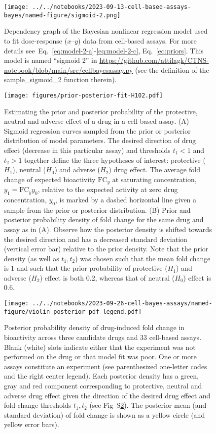 \documentclass[letterpaper]{article}
\begin{document}
\begin{figure}[p]
\texttt{[image: ../../notebooks/2023-09-13-cell-based-assays-bayes/named-figure/sigmoid-2.png]}
\caption{Dependency graph of the Bayesian nonlinear regression model used to
  fit dose-response ($x$--$y$) data from cell-based assays.
  For more details see~Eq.~\ref{eq:model-2-a}-\ref{eq:model-2-c},
  Eq.~\ref{eq:priors}.  This model is named ``sigmoid 2'' in
  \url{https://github.com/attilagk/CTNS-notebook/blob/main/src/cellbayesassay.py}
  (see the definition of the sample\_sigmoid\_2 function therein).
}
\label{fig:model-2-plate}
\end{figure}


\begin{figure}[p]
\texttt{[image: figures/prior-posterior-fit-H102.pdf]}
\caption{Estimating the prior and posterior probability of the protective, neutral
  and adverse effect of a drug in a cell-based assay.  (A) Sigmoid regression
  curves sampled from the prior or posterior distribution of model parameters.
  The desired direction of drug effect (decrease in this particular assay) and
  thresholds $t_1<1$ and $t_2>1$ together define the three hypotheses of
  interest: protective ($H_1$), neutral ($H_0$) and adverse ($H_2$) drug
  effect.  The average fold change of expected bioactivity $\mathrm{FC}_y$ at
  saturating concentration, $y_1=\mathrm{FC}_y y_0$, relative to the expected activity
  at zero drug concentration, $y_0$, is marked by a dashed horizontal line
  given a sample from the prior or posterior distribution.  (B) Prior and
  posterior probability density of fold change for the same drug and assay as
  in (A).  Observe how the posterior density is shifted towards the desired
  direction and has a decreased standard deviation (vertical error bar)
  relative to the prior density.  Note that the prior density (as well as
  $t_1, t_2$) was chosen such
  that the mean fold change is 1 and such that the prior probability of
  protective ($H_1$) and adverse ($H_2$) effect is both 0.2, whereas that of
  neutral ($H_0$) effect is 0.6.
}
\label{fig:prior-posterior-fit-H102}
\end{figure}


\begin{figure}[p]
\texttt{[image: ../../notebooks/2023-09-26-cell-bayes-assays/named-figure/violin-posterior-pdf-legend.pdf]}
\caption{Posterior probability density of drug-induced fold change in
  bioactivity across three candidate
  drugs and 33 cell-based assays. Blank (white) slots indicate either that the experiment was not
  performed on the drug or that model fit was poor.  One or more assays constitute an experiment
  (see parenthesized one-letter codes and the right center legend).  Each
  posterior density has a green, gray and red component corresponding to
  protective, neutral and adverse drug effect given the direction of the
  desired drug effect and fold-change thresholds $t_1, t_2$ (see
  Fig~S\ref{fig:prior-posterior-fit-H102}).  The posterior mean (and standard
  deviation) of fold change is shown as a yellow circle (and yellow error
  bars).
}
\label{fig:violin-posterior-assays}
\end{figure}
\end{document}
